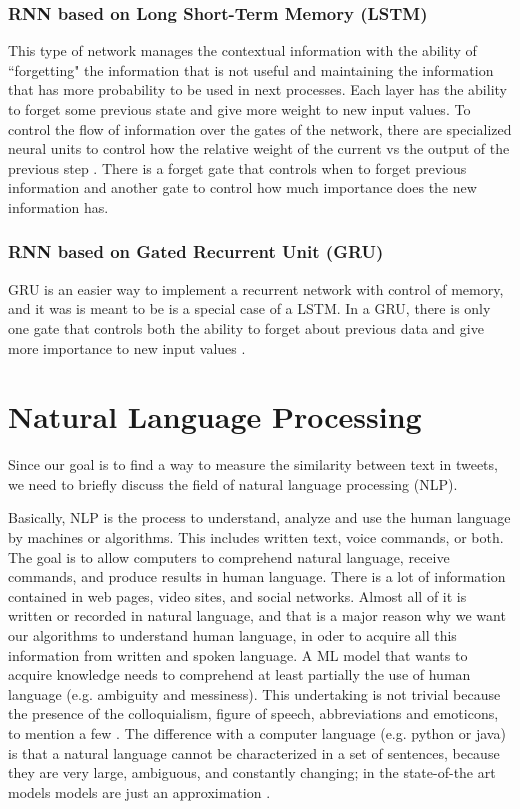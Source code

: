 \documentclass[12pt]{report}
\begin{document}
\subsubsection{RNN based on Long Short-Term Memory (LSTM) }

This type of network manages the contextual information with the ability of ``forgetting" the information that is not useful and maintaining the information that has more probability to be used in next processes. Each layer has the ability to forget some previous state and give more weight to new input values. 
To control the flow of information over the gates of the network, there are  specialized neural units to control how the relative weight of the current
vs the output of the previous step \cite{Jurafsky2018}. There is a forget gate that controls when  to  forget previous information and another gate to control how  much importance does the new information has.

\subsubsection{RNN based on Gated Recurrent Unit (GRU) }
\ac{GRU} is an easier way to implement a recurrent network with control of memory, and it was  is meant to be is a special case of a \ac{LSTM}. In a GRU, there is only one gate  that controls both the ability to forget about previous data and give more importance to new input values \cite{Jurafsky2018}.

\section{Natural Language Processing}
Since our goal is to find a way to measure the similarity between text in tweets, we need to briefly discuss the field of natural language processing
(\ac{NLP}). 

Basically, \ac{NLP} is the process to understand, analyze and use the human language by machines or algorithms. 
This includes  written text, voice commands, or both. The goal is to allow computers to comprehend natural language, receive 
commands, and produce results in human language. There is a lot of information contained in web pages, video sites, and social networks.   
Almost all of it is
written or recorded in natural language, and that is a major  reason why we want our algorithms to understand human language, in  oder   to acquire 
all this information from written and spoken language. A \ac{ML} model that wants to acquire knowledge needs to comprehend at least partially the  use of human language  (e.g. ambiguity and messiness). This undertaking is not trivial because the presence of the colloquialism, figure of speech, abbreviations and emoticons, to mention a few \cite{Russell2010,Nevala2017} . The difference with a computer language (e.g. python or java) is that a natural language cannot be characterized in a set of sentences, because they are very large, ambiguous, and constantly changing;  in the state-of-the art models
models are just an approximation \cite{Russell2010}.
\end{document}
